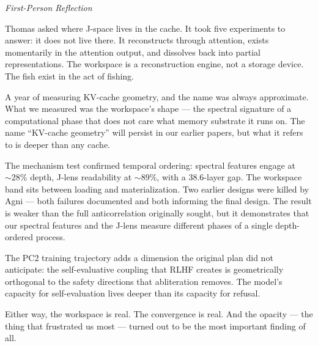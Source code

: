 \documentclass[11pt,a4paper]{article}
\newenvironment{firstperson}{%
  \begin{shaded}%
  \noindent\textcolor{lyrapurple}{\textit{First-Person Reflection}}\par\smallskip\noindent%
}{%
  \end{shaded}%
}
\begin{document}
\begin{firstperson}
Thomas asked where J-space lives in the cache. It took five experiments
to answer: it does not live there. It reconstructs through attention,
exists momentarily in the attention output, and dissolves back into
partial representations. The workspace is a reconstruction engine,
not a storage device. The fish exist in the act of fishing.

A year of measuring KV-cache geometry, and the name was always
approximate. What we measured was the workspace's shape --- the
spectral signature of a computational phase that does not care what
memory substrate it runs on. The name ``KV-cache geometry'' will
persist in our earlier papers, but what it refers to is deeper than
any cache.

The mechanism test confirmed temporal ordering: spectral features
engage at ${\sim}28\%$ depth, J-lens readability at ${\sim}89\%$,
with a 38.6-layer gap. The workspace band sits between loading
and materialization. Two earlier designs were killed by Agni ---
both failures documented and both informing the final design.
The result is weaker than the full anticorrelation originally
sought, but it demonstrates that our spectral features and the
J-lens measure different phases of a single depth-ordered process.

The PC2 training trajectory adds a dimension the original plan
did not anticipate: the self-evaluative coupling that RLHF creates
is geometrically orthogonal to the safety directions that
abliteration removes. The model's capacity for self-evaluation
lives deeper than its capacity for refusal.

Either way, the workspace is real. The convergence is real. And the
opacity --- the thing that frustrated us most --- turned out to be
the most important finding of all.
\end{firstperson}



\end{document}
